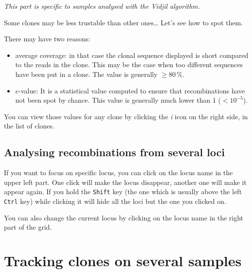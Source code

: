 \documentclass[11pt]{article}
\begin{document}
\bigskip

\textit{This part is specific to samples analysed with the Vidjil algorithm.}

Some clones may be less trustable than other ones\dots{} Let's see how to spot them.

There may have two reasons: 
\begin{itemize}
\item average coverage: in that case the clonal sequence displayed is short
  compared to the reads in the clone. This may be the case when too different
  sequences have been put in a clone. The value is generally $\geq 80\,\%$.
\item $e$-value: It is a statistical value computed to ensure that
  recombinations have not been spot by chance. This value is generally much
  lower than 1 ($<10^{-5}$).
\end{itemize}

You can view those values for any clone by clicking the \textit{i} icon on the
right side, in the list of clones.
\subsection{Analysing recombinations from several loci}

If you want to focus on specific locus, you can click on the locus name in
the upper left part. One click will make the locus disappear, another one will
make it appear again.
If you hold the \texttt{Shift} key (the one which is usually above the left
\texttt{Ctrl} key) while clicking it will hide all the loci but the one you
clicked on.




You can also change the current locus by clicking on the locus name in the
right part of the grid.


\section{Tracking clones on several samples}
\end{document}

